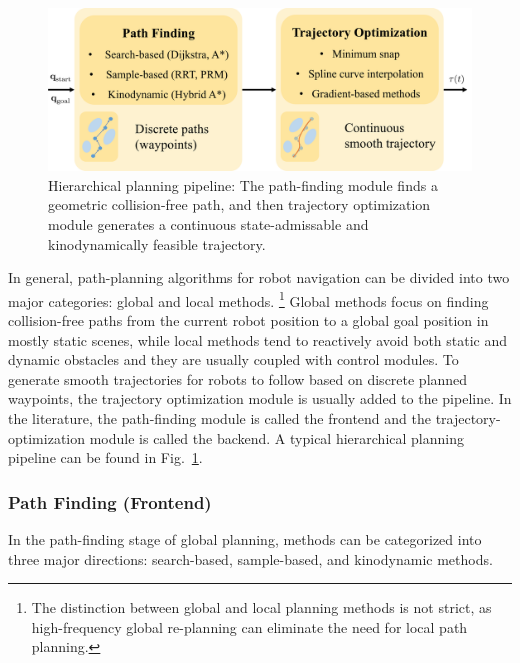 \documentclass[letterpaper,journal,twoside]{IEEEtran}
\begin{document}
\begin{figure}[h]
  \centering
  \includegraphics[width=.5\textwidth]
  {../figures/frontback.png}
  \caption{Hierarchical planning pipeline: The path-finding module 
finds a geometric collision-free path, and then trajectory
optimization module generates a continuous state-admissable and kinodynamically
feasible trajectory.}
  \label{fig:concept}
\end{figure}
In general, path-planning algorithms for robot navigation 
can be divided into two major categories: 
global and local methods.
\footnote{The distinction between global and local
planning methods is not strict, as high-frequency global 
re-planning can eliminate the need for local path planning.}  
Global methods focus on finding collision-free paths from 
the current robot position to a global goal position in mostly 
static scenes, while local methods tend to reactively 
avoid both static and dynamic obstacles and they are usually coupled with control modules. 
To generate smooth trajectories for robots to 
follow based on discrete planned waypoints, the 
trajectory optimization module is usually added to 
the pipeline. 
In the literature, the path-finding module 
is called the frontend and the 
trajectory-optimization module is called the backend. 
A typical hierarchical planning pipeline can be 
found in Fig.~\ref{fig:concept}.

\subsubsection{Path Finding (Frontend)}

In the path-finding stage of global planning, 
methods can be categorized 
into three major directions: {search-based}, 
{sample-based}, and {kinodynamic} methods. 
\end{document}
